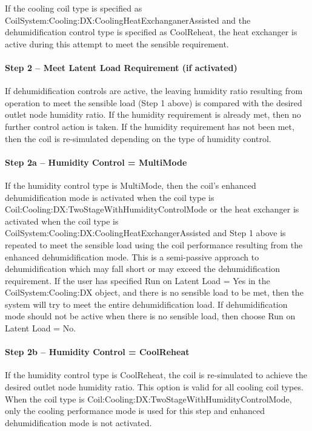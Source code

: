 If the cooling coil type is specified as CoilSystem:Cooling:DX:CoolingHeatExchanganerAssisted and the dehumidification control type is specified as CoolReheat, the heat exchanger is active during this attempt to meet the sensible requirement.

\paragraph{Step 2 -- Meet Latent Load Requirement (if activated)}\label{step-2-meet-latent-load-requirement-if-activated-1}

If dehumidification controls are active, the leaving humidity ratio resulting from operation to meet the sensible load (Step 1 above) is compared with the desired outlet node humidity ratio. If the humidity requirement is already met, then no further control action is taken. If the humidity requirement has not been met, then the coil is re-simulated depending on the type of humidity control.

\paragraph{Step 2a -- Humidity Control = MultiMode}\label{step-2a-humidity-control-multimode-1}

If the humidity control type is MultiMode, then the coil's enhanced dehumidification mode is activated when the coil type is Coil:Cooling:DX:TwoStageWithHumidityControlMode or the heat exchanger is activated when the coil type is \\
CoilSystem:Cooling:DX:CoolingHeatExchangerAssisted and Step 1 above is repeated to meet the sensible load using the coil performance resulting from the enhanced dehumidification mode. This is a semi-passive approach to dehumidification which may fall short or may exceed the dehumidification requirement. If the user has specified Run on Latent Load = Yes in the CoilSystem:Cooling:DX object, and there is no sensible load to be met, then the system will try to meet the entire dehumidification load. If dehumidification mode should not be active when there is no sensible load, then choose Run on Latent Load = No.

\paragraph{Step 2b -- Humidity Control = CoolReheat}\label{step-2b-humidity-control-coolreheat-1}

If the humidity control type is CoolReheat, the coil is re-simulated to achieve the desired outlet node humidity ratio. This option is valid for all cooling coil types. When the coil type is Coil:Cooling:DX:TwoStageWithHumidityControlMode, only the cooling performance mode is used for this step and enhanced dehumidification mode is not activated.

